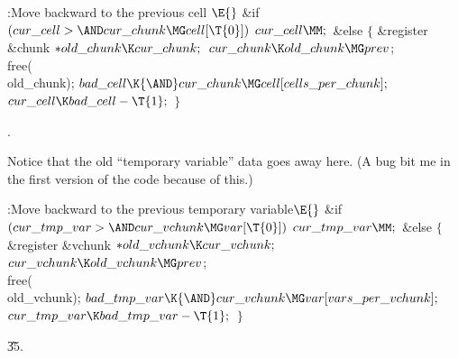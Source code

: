 \B{}:Move  backward to the previous cell%
\X${}\E{}$\6
\&{if} ${}(\\{cur\_cell}>{\AND}\\{cur\_chunk}\MG\\{cell}[\T{0}]){}$\1\5
${}\\{cur\_cell}\MM;{}$\2\6
\&{else}\5
${}\{{}$\1\6
\&{register} \&{chunk} ${}{*}\\{old\_chunk}\K\\{cur\_chunk};{}$\7
${}\\{cur\_chunk}\K\\{old\_chunk}\MG\\{prev}{}$;\5
\\{free}(\\{old\_chunk});\6
${}\\{bad\_cell}\K{\AND}\\{cur\_chunk}\MG\\{cell}[\\{cells\_per\_chunk}];{}$\6
${}\\{cur\_cell}\K\\{bad\_cell}-\T{1};{}$\6
\4${}\}{}$\2\par
{}.\fi

Notice that the old ``temporary variable'' data goes away
here.
(A bug bit me in the first version of the code because of this.)

\Y\B\4:Move  backward to the previous temporary
variable\X${}\E{}$\6
\&{if} ${}(\\{cur\_tmp\_var}>{\AND}\\{cur\_vchunk}\MG\\{var}[\T{0}]){}$\1\5
${}\\{cur\_tmp\_var}\MM;{}$\2\6
\&{else}\5
${}\{{}$\1\6
\&{register} \&{vchunk} ${}{*}\\{old\_vchunk}\K\\{cur\_vchunk};{}$\7
${}\\{cur\_vchunk}\K\\{old\_vchunk}\MG\\{prev}{}$;\5
\\{free}(\\{old\_vchunk});\6
${}\\{bad\_tmp\_var}\K{\AND}\\{cur\_vchunk}\MG\\{var}[\\{vars\_per%
\_vchunk}];{}$\6
${}\\{cur\_tmp\_var}\K\\{bad\_tmp\_var}-\T{1};{}$\6
\4${}\}{}$\2\par
\U35.\fi


